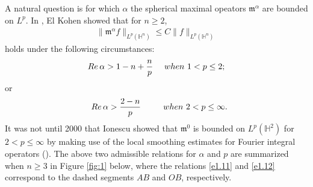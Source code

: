 \documentclass[11pt]{amsproc}
\newcommand{\0}{\mathbf{0}}
\renewcommand{\H}{\mathbb{H}}
\numberwithin{equation}{section}
\numberwithin{figure}{section}
\theoremstyle{definition}
\theoremstyle{remark}
\numberwithin{thm}{section}
\begin{document}
A natural question is for which $\alpha$ the spherical maximal opeators ${\mathfrak m}^\alpha$  are bounded on $L^p$. In \cite[Theorem 3]{Ko}, El Kohen showed that for $n\geq 2$,
\begin{eqnarray}\label{e1.10}
\|{\mathfrak m}^\alpha f\|_{L^p(\H^n)}\leq C\| f\|_{L^p(\H^n)}
\end{eqnarray}
holds under the following circumstances:
\begin{eqnarray}\label{e1.11}
{\rm Re}\, \alpha>1-n+ {n\over p} \ \ \ \     {\rm when}\     1<p\leq 2;
\end{eqnarray}
or
\begin{eqnarray}\label{e1.12}
\ \ {\rm Re}\, \alpha>{2-n\over p}   \ \ \ \   \ \ \ \  {\rm when}\   2< p\leq \infty.
\end{eqnarray}
It was not until 2000 that Ionescu \cite{Io} showed that ${\mathfrak m}^0 $ is bounded on $L^p(\H^2)$ for $2<p\leq \infty$ by making use of the local smoothing estimates for Fourier integral operators (\cite{So2}).
The above two admissible relations for $\alpha$ and $p$ are summarized when $n\geq 3$ in Figure \ref{fig:1}
below, where the relations \eqref{e1.11} and \eqref{e1.12} correspond to the dashed segments $AB$ and $OB$, respectively.
\end{document}
